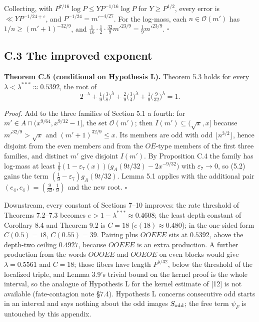 \documentclass[11pt,a4paper]{article}
\begin{document}
Collecting, with \(P^{7/16}\log P\le YP^{-1/16}\log P\) for
\(Y\ge P^{1/2}\), every error is \(\ll YP^{-1/24+\varepsilon}\), and
\(P^{-1/24}=m'^{-4/27}\). For the log-mass, each \(n\in\mathcal O(m')\)
has \(1/n\ge(m'+1)^{-32/9}\), and
\(\tfrac1{16}\cdot\tfrac12\cdot\tfrac{32}9m'^{23/9}=\tfrac19m'^{23/9}\).
\(\square\)

\subsection{C.3 The improved exponent}\label{c.3-the-improved-exponent}

\textbf{Theorem C.5 (conditional on Hypothesis L).} Theorem 5.3 holds
for every \(\lambda<\lambda^{***}\approx0.5392\), the root of \[
2^{-\lambda}+\tfrac19\bigl(\tfrac38\bigr)^{\lambda}+\tfrac29\bigl(\tfrac34\bigr)^{\lambda}+\tfrac19\bigl(\tfrac9{32}\bigr)^{\lambda}=1 .
\]

\emph{Proof.} Add to the three families of Section 5.1 a fourth: for
\(m'\in A\cap(x^{9/64},x^{9/32}-1]\), the set \(\mathcal O(m')\); then
\(I(m')\subseteq(\sqrt x,x]\) because \(m'^{32/9}>\sqrt x\) and
\((m'+1)^{32/9}\le x\). Its members are odd with odd
\(\lfloor n^{3/2}\rfloor\), hence disjoint from the even members and
from the \(OE\)-type members of the first three families, and distinct
\(m'\) give disjoint \(I(m')\). By Proposition C.4 the family has
log-mass at least
\(\tfrac19(1-\varepsilon_7(x))\bigl(g_A(9t/32)-2x^{-9/32}\bigr)\) with
\(\varepsilon_7\to 0\), so (5.2) gains the term
\((\tfrac19-\varepsilon_7)g_A(9t/32)\). Lemma 5.1 applies with the
additional pair \((e_4,c_4)=(\tfrac9{32},\tfrac19)\) and the new root.
\(\square\)

Downstream, every constant of Sections 7--10 improves: the rate
threshold of Theorems 7.2--7.3 becomes
\(e>1-\lambda^{***}\approx0.4608\); the least depth constant of
Corollary 8.4 and Theorem 9.2 is \(C=18\) (\(e(18)\approx0.480\)); in
the one-sided form \(C(0.5)=18\), \(C(0.55)=39\). Pairing plus \(OOEEE\)
sits at \(0.5392\), above the depth-two ceiling \(0.4927\), because
\(OOEEE\) is an extra production. A further production from the words
\(OOOEE\) and \(OOEOE\) on even blocks would give \(\lambda=0.5561\) and
\(C=18\); those fibers have length \(P^{5/32}\), below the threshold of
the localized triple, and Lemma 3.9's trivial bound on the kernel proof
is the whole interval, so the analogue of Hypothesis L for the kernel
estimate of {[}12{]} is not available (fate-contagion note §7.4).
Hypothesis L concerns consecutive odd starts in an interval and says
nothing about the odd images \(S_{\rm odd}\); the free term \(\psi_F\)
is untouched by this appendix.
\end{document}
